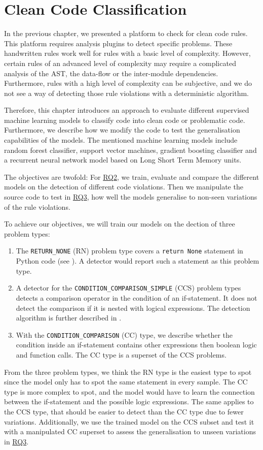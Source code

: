 \section{Clean Code Classification}\label{chap:clean_code_classification}
In the previous chapter, we presented a platform to check for clean code rules. This platform requires analysis plugins to detect specific problems. These handwritten rules work well for rules with a basic level of complexity. However, certain rules of an advanced level of complexity may require a complicated analysis of the AST, the data-flow or the inter-module dependencies. Furthermore, rules with a high level of complexity can be subjective, and we do not see a way of detecting those rule violations with a deterministic algorithm.

Therefore, this chapter introduces an approach to evaluate different supervised machine learning models to classify code into clean code or problematic code. Furthermore, we describe how we modify the code to test the generalisation capabilities of the models. The mentioned machine learning models include random forest classifier, support vector machines, gradient boosting classifier and a recurrent neural network model based on Long Short Term Memory units. 

The objectives are twofold: For \hyperref[rq:2]{RQ2}, we train, evaluate and compare the different models on the detection of different code violations. Then we manipulate the source code to test in \hyperref[rq:3]{RQ3}, how well the models generalise to non-seen variations of the rule violations.

To achieve our objectives, we will train our models on the dection of three problem types: 
\begin{enumerate}
    \item The \texttt{RETURN\_NONE} (RN) problem type covers a \texttt{return None} statement in Python code (see ). A detector would report such a statement as this problem type.
    \item A detector for the \texttt{CONDITION\_COMPARISON\_SIMPLE} (CCS) problem types detects a comparison operator in the condition of an if-statement. It does not detect the comparison if it is nested with logical expressions. The detection algorithm is further described in .
    \item With the \texttt{CONDITION\_COMPARISON} (CC) type, we describe whether the condition inside an if-statement contains other expressions then boolean logic and function calls. The CC type is a superset of the CCS problems. 
\end{enumerate}
From the three problem types, we think the RN type is the easiest type to spot since the model only has to spot the same statement in every sample. The CC type is more complex to spot, and the model would have to learn the connection between the if-statement and the possible logic expressions. The same applies to the CCS type, that should be easier to detect than the CC type due to fewer variations. Additionally, we use the trained model on the CCS subset and test it with a manipulated CC superset to assess the generalisation to unseen variations in \hyperref[rq:3]{RQ3}.

